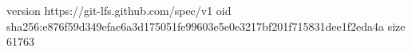 version https://git-lfs.github.com/spec/v1
oid sha256:e876f59d349efae6a3d175051fe99603e5e0e3217bf201f715831dee1f2eda4a
size 61763
